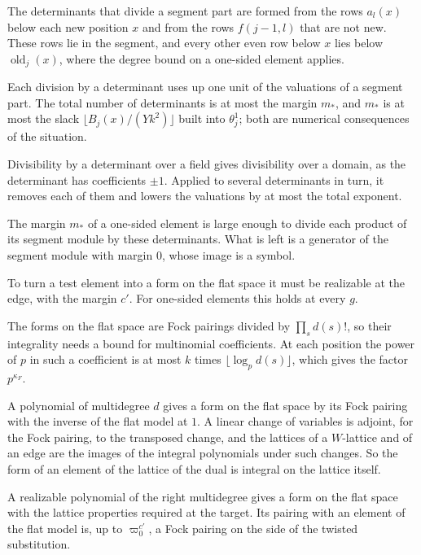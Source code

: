 The determinants that divide a segment part are formed from the rows $a_l(x)$ below each new position $x$ and
from the rows $f(j-1,l)$ that are not new. These rows lie in the segment, and every other even row below $x$ lies
below $\operatorname{old}_j(x)$, where the degree bound on a one-sided element applies.

Each division by a determinant uses up one unit of the valuations of a segment part. The total number of
determinants is at most the margin $m_*$, and $m_*$ is at most the slack $\lfloor B_j(x)/(Yk^2)\rfloor$ built into
$\theta^1_j$; both are numerical consequences of the situation.

Divisibility by a determinant over a field gives divisibility over a domain, as the determinant has coefficients
$\pm1$. Applied to several determinants in turn, it removes each of them and lowers the valuations by at most the
total exponent.

The margin $m_*$ of a one-sided element is large enough to divide each product of its segment module by these
determinants. What is left is a generator of the segment module with margin $0$, whose image is a symbol.

To turn a test element into a form on the flat space it must be realizable at the edge, with the margin
$c'$. For one-sided elements this holds at every $g$.

The forms on the flat space are Fock pairings divided by $\prod_sd(s)!$, so their integrality needs a bound
for multinomial coefficients. At each position the power of $p$ in such a coefficient is at most $k$ times
$\lfloor\log_pd(s)\rfloor$, which gives the factor $p^{\kappa_F}$.

A polynomial of multidegree $d$ gives a form on the flat space by its Fock pairing with the inverse of the flat
model at $1$. A linear change of variables is adjoint, for the Fock pairing, to the transposed change, and the
lattices of a $W$-lattice and of an edge are the images of the integral polynomials under such changes. So the
form of an element of the lattice of the dual is integral on the lattice itself.

A realizable polynomial of the right multidegree gives a form on the flat space with the lattice properties
required at the target. Its pairing with an element of the flat model is, up to $\varpi_0^{c'}$, a Fock
pairing on the side of the twisted substitution.

